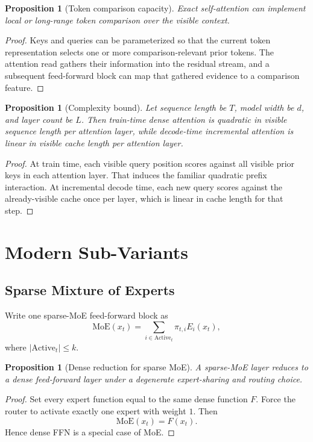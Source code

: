 \documentclass[11pt]{article}
\newtheorem{proposition}[definition]{Proposition}
\begin{document}
\begin{proposition}[Token comparison capacity]
Exact self-attention can implement local or long-range token comparison over
the visible context.
\end{proposition}

\begin{proof}
Keys and queries can be parameterized so that the current token representation
selects one or more comparison-relevant prior tokens. The attention read gathers
their information into the residual stream, and a subsequent feed-forward block
can map that gathered evidence to a comparison feature.
\end{proof}

\begin{proposition}[Complexity bound]
Let sequence length be $T$, model width be $d$, and layer count be $L$. Then
train-time dense attention is quadratic in visible sequence length per
attention layer, while decode-time incremental attention is linear in visible
cache length per attention layer.
\end{proposition}

\begin{proof}
At train time, each visible query position scores against all visible prior
keys in each attention layer. That induces the familiar quadratic prefix
interaction. At incremental decode time, each new query scores against the
already-visible cache once per layer, which is linear in cache length for that
step.
\end{proof}

\section{Modern Sub-Variants}

\subsection{Sparse Mixture of Experts}

Write one sparse-MoE feed-forward block as
\[
  \mathrm{MoE}(x_t) = \sum_{i \in \mathrm{Active}_t} \pi_{t,i} E_i(x_t),
\]
where $|\mathrm{Active}_t| \le k$.

\begin{proposition}[Dense reduction for sparse MoE]
A sparse-MoE layer reduces to a dense feed-forward layer under a degenerate
expert-sharing and routing choice.
\end{proposition}

\begin{proof}
Set every expert function equal to the same dense function $F$. Force the
router to activate exactly one expert with weight $1$. Then
\[
  \mathrm{MoE}(x_t) = F(x_t).
\]
Hence dense FFN is a special case of MoE.
\end{proof}
\end{document}
